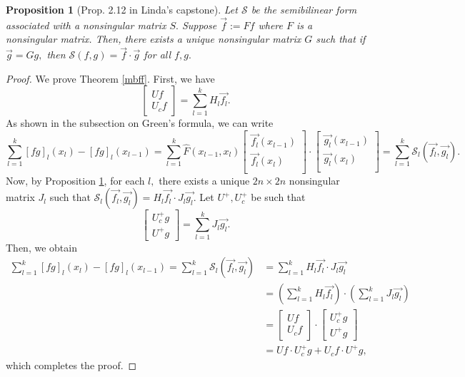 \documentclass[11pt,reqno,oneside,a4paper]{article}
\theoremstyle{plain} %
\newtheorem{proposition}{Proposition}
\theoremstyle{definition}
\theoremstyle{remark}
\begin{document}
\begin{proposition}[Prop. 2.12 in Linda's capstone]\label{linfan-2.12}
Let $\mathcal{S}$ be the semibilinear form associated with a nonsingular matrix $S.$ Suppose $\vec{f} := Ff$ where $F$ is a nonsingular matrix. Then, there exists a unique nonsingular matrix $G$ such that if $\vec{g} =Gg,$ then $\mathcal{S}(f,g) = \vec{f}\cdot \vec{g}$ for all $f,g.$
\end{proposition}
\begin{proof}
We prove Theorem \ref{mbff}. 
First, we have 
\[ 
\begin{bmatrix}
Uf \\
U_c f
\end{bmatrix} = \sum^k_{l=1}
H_l \vec{f_l}.
\]
As shown in the subsection on Green's formula, we can write 
\[ 
\sum_{l=1}^{k} [fg]_l(x_l) - [fg]_l(x_{l-1}) =  \sum_{l=1}^{k} \widehat{F}(x_{l-1}, x_l) \begin{bmatrix}
\vec{f_l}(x_{l-1})  \\
\vec{f_l}(x_{l})  \\
\end{bmatrix}
\cdot
\begin{bmatrix}
\vec{g_l}(x_{l-1})  \\
\vec{g_l}(x_{l})  \\
\end{bmatrix}   = \sum_{l=1}^{k}  \mathcal{S}_l (\vec{f_l}, \vec{g_l}).
\]
Now, by Proposition \ref{linfan-2.12}, for each $l,$ there exists a unique $2n\times 2n$ nonsingular matrix $J_l$ such that $\mathcal{S}_l (\vec{f_l}, \vec{g_l}) = H_l \vec{f_l} \cdot J_l \vec{g_l}.$ Let $U^+, U^+_c$ be such that 
\[
\begin{bmatrix}
U^+_cg \\
U^+ g
\end{bmatrix} = \sum^k_{l=1}
J_l \vec{g_l}.
\]
Then, we obtain 
\begin{align*}
\sum_{l=1}^{k} [fg]_l(x_l) - [fg]_l(x_{l-1})  =  \sum_{l=1}^{k}  \mathcal{S}_l (\vec{f_l}, \vec{g_l}) &= \sum_{l=1}^{k}  H_l \vec{f_l} \cdot J_l \vec{g_l} \\
&= \left( \sum_{l=1}^{k}  H_l \vec{f_l}\right) \cdot \left( \sum_{l=1}^{k}  J_l \vec{g_l} \right) \\
&= \begin{bmatrix}
Uf \\
U_c f
\end{bmatrix} \cdot 
\begin{bmatrix}
U^+_cg \\
U^+ g
\end{bmatrix} \\
&=  Uf\cdot U^+_c g + U_c f \cdot U^+ g,
\end{align*}
which completes the proof.
\end{proof}
\end{document}
